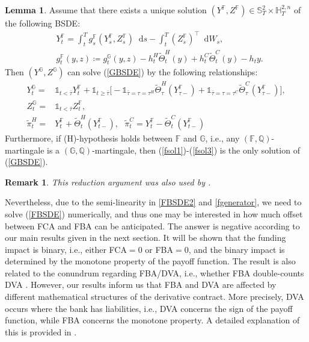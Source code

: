 \documentclass[a4paper, 11pt]{article}              %
\numberwithin{equation}{section}
\theoremstyle{plain}
\newcommand{\btau}{\bar{\tau}}
\newcommand{\1}{\mathds{1}}
\newcommand{\pit}{\tilde{\pi}}
\newcommand{\dsF}{\mathbb{F}}
\newcommand{\dsH}{\mathbb{H}}
\newcommand{\dsQ}{\mathbb{Q}}
\newcommand{\dsS}{\mathbb{S}}
\newcommand{\dsG}{\mathbb{G}}
\newcommand{\Jt}{\tilde{\Theta}}
\theoremstyle{plain}
\newtheorem{lemma}[thm]{Lemma}
\theoremstyle{definition}
\newtheorem{remark}[thm]{Remark} %
\newtheorem{lemma}{Lemma}
\theoremstyle{plain}
\newtheorem{remark}{Remark}
\newcommand*\df{\mathop{}\!\mathrm{d}}
\begin{document}
\begin{lemma}\label{lemma:reduction}
Assume that there exists a unique solution $(Y^\dsF, Z^\dsF) \in \dsS^{2}_T \times \dsH^{2, n}_T$ of the following BSDE:
\begin{align}
  &Y^{\dsF}_t = \int_{t}^{T}g^{\dsF}_s(Y^{\dsF}_s, Z^{\dsF}_s) \df s - \int_{t}^{T}(Z^{\dsF}_s)^{\top}
                \df W_s,    \label{FBSDE2} \\
 &g^\dsF_t(y, z) \coloneqq g^\dsG_t(y, z) - h^H_t\Jt^{H}_t(y) +
                           h^C_t\Jt^{C}_t(y)-h_ty.
                           \label{fgenerator}
\end{align}
Then $(Y^\dsG, Z^\dsG)$ can solve (\ref{GBSDE}) by the following relationships:
\begin{align}
  Y^{\dsG}_t =
  & \1_{t <\btau}Y^{\dsF}_t + \1_{t \geq \btau} \big[-\1_{\btau=\tau=\tau^H}
    \Jt^{H}_{\tau}(Y^{\dsF}_{\tau-})+\1_{\btau=\tau=\tau^C}\Jt^{C}_{\tau}(Y^{\dsF}_{\tau-}) \big], \label{fsol1}\\
  Z^\dsG_t =& \1_{t < \btau}Z^\dsF_t,\\
  \pit^H_t =& Y^\dsF_t + \Jt^H_t(Y^\dsF_{t-}), ~~~\pit^C_t = Y^\dsF_t -
              \Jt^C_t(Y^\dsF_{t-})\label{fsol3} 
 \end{align}
Furthermore, if (H)-hypothesis holds between $\dsF$ and $\dsG$, i.e., any  $(\dsF,
\dsQ)$-martingale is a $(\dsG, \dsQ)$-martingale, then (\ref{fsol1})-(\ref{fsol3}) is
the only solution of (\ref{GBSDE}).
\begin{remark}
This reduction argument was also used by \cite{bichuch2017arbitrage,
  crepey2015bilateral1, crepey2015bilateral2, brigo2016analysis}.   
\end{remark}
\end{lemma}
Nevertheless, due to the semi-linearity in \cref{FBSDE2} and \cref{fgenerator},
we need to solve (\ref{FBSDE}) numerically, and thus one may be interested in
how much offset between FCA and FBA can be anticipated. The answer is negative
according to our main results given in the next section. It will be shown that
the funding impact is binary, i.e., either FCA$=0$ or FBA$=0$, and the binary
impact is determined by the monotone property of the payoff function.  The
result is also related to the conundrum regarding FBA/DVA, i.e., whether FBA
double-counts DVA \cite[see][]{cameron2013black}.  However, our results inform us
that FBA and DVA are affected by different mathematical structures of the
derivative contract. More precisely, DVA occurs where the bank has liabilities,
i.e., DVA concerns the sign of the payoff function, while FBA concerns
the monotone property. A detailed explanation of this is provided in
.
\end{document}
